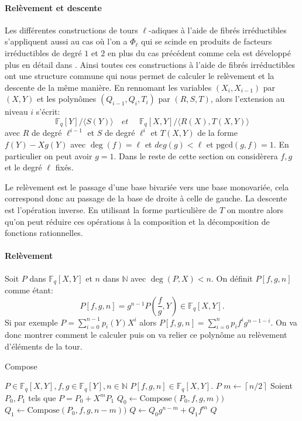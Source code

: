 \documentclass[10pt,a4paper]{book}
\theoremstyle{plain}
\theoremstyle{definition}
\theoremstyle{definition}
\theoremstyle{definition}
\theoremstyle{definition}
\theoremstyle{remark}
\theoremstyle{remark}
\begin{document}
\paragraph{Relèvement et descente}
Les différentes constructions de tours $\ell$-adiques à l'aide de fibrés irréductibles s'appliquent aussi au cas où l'on a $\Phi_{\ell}$ qui se scinde en produits de facteurs irréductibles de degré $1$ et $2$ en plus du cas précédent comme cela est développé plus en détail dans \cite{DeFeo-Doliskani-Schost13}. Ainsi toutes ces constructions à l'aide de fibrés irréductibles ont une structure commune qui nous permet de calculer le relèvement et la descente de la même manière. En rennomant les variables $(X_i,X_{i-1})$ par $(X,Y)$ et les polynômes $(Q_{i-1},Q_{i},T_i)$ par $(R,S,T)$, alors l'extension au niveau $i$ s'écrit:
\begin{equation}
\mathbb{F}_q[Y]/\langle S(Y) \rangle  \quad \textit{et } \quad \mathbb{F}_q[X,Y]/ \langle R(X), T(X,Y) \rangle
\end{equation}
avec $R$ de degré $\ell^{i-1}$ et $S$ de degré $\ell^i$ et $T(X,Y)$ de la forme $f(Y) -Xg(Y)$ avec $\deg(f)=\ell$ et $deg(g)< \ell$ et $ \mathrm{pgcd}(g,f)=1$. En particulier on peut avoir $g=1$. Dans le reste de cette section on considèrera $f,g$ et le degré $\ell$ fixés.

Le relèvement est le passage d'une base bivariée vers une base monovariée, cela correspond donc au passage de la base de droite à celle de gauche. La descente est l'opération inverse. En utilisant la forme particulière de $T$ on montre alors qu'on peut réduire ces opérations à la composition et la décomposition de fonctions rationnelles.

\paragraph{Relèvement}
Soit $P$ dans $\mathbb{F}_q[X,Y]$ et $n$ dans $\mathbb{N}$ avec $\deg(P,X)<n$. On définit $P[f,g,n]$ comme étant:
\[
P[f,g,n]=g^{n-1}P(\frac{f}{g},Y)\in \mathbb{F}_q[X,Y].
\]
Si par exemple $P=\sum_{i=0}^{n-1}p_i(Y)X^i$ alors $P[f,g,n]=\sum_{i=0}^{n}p_if^ig^{n-1-i}$. On va donc montrer comment le calculer puis on va relier ce polynôme au relèvement d'éléments de la tour.

\begin{algorithm}
\caption{\label{alg:Compose}Compose}
\begin{algorithmic}[1]
\REQUIRE $P \in \mathbb{F}_q[X,Y], f,g \in \mathbb{F}_q[Y], n \in \mathbb{N}$
\ENSURE $P[f,g,n] \in \mathbb{F}_q[X,Y]$.
 \RETURN $P$
\ELSE
\STATE $m \gets \left\lceil n/2 \right\rceil   $
\STATE Soient $P_0,P_1$ tels que $P=P_0 + X^{m} P_1$
\STATE $Q_0 \gets \textrm{Compose}(P_0,f,g,m))$
\STATE $Q_1 \gets \textrm{Compose}(P_0,f,g,n-m))$
\STATE $Q \gets Q_0g^{n-m}+Q_1f^m$
\RETURN $Q$ 
\ENDIF
\end{algorithmic}
\end{algorithm}
\end{document}
